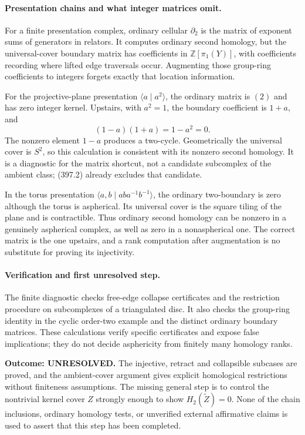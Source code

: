 \documentclass[11pt]{article}
\begin{document}
\paragraph{Presentation chains and what integer matrices omit.}
For a finite presentation complex, ordinary cellular $\partial_2$ is
the matrix of exponent sums of generators in relators. It computes
ordinary second homology, but the universal-cover boundary matrix has
coefficients in $\mathbb Z[\pi_1(Y)]$, with coefficients recording
where lifted edge traversals occur. Augmenting those group-ring
coefficients to integers forgets exactly that location information.

For the projective-plane presentation $\langle a\mid a^2\rangle$,
the ordinary matrix is $(2)$ and has zero integer kernel. Upstairs,
with $a^2=1$, the boundary coefficient is $1+a$, and
\[
 (1-a)(1+a)=1-a^2=0.
\]
The nonzero element $1-a$ produces a two-cycle. Geometrically the
universal cover is $S^2$, so this calculation is consistent with its
nonzero second homology. It is a diagnostic for the matrix shortcut,
not a candidate subcomplex of the ambient class; (397.2) already
excludes that candidate.

In the torus presentation $\langle a,b\mid aba^{-1}b^{-1}\rangle$,
the ordinary two-boundary is zero although the torus is aspherical.
Its universal cover is the square tiling of the plane and is contractible.
Thus ordinary second homology can be nonzero in a genuinely aspherical
complex, as well as zero in a nonaspherical one. The correct matrix is
the one upstairs, and a rank computation after augmentation is no
substitute for proving its injectivity.

\paragraph{Verification and first unresolved step.}
The finite diagnostic checks free-edge collapse certificates and the
restriction procedure on subcomplexes of a triangulated disc. It also
checks the group-ring identity in the cyclic order-two example and
the distinct ordinary boundary matrices. These calculations verify
specific certificates and expose false implications; they do not decide
asphericity from finitely many homology ranks.

\textbf{Outcome: UNRESOLVED.} The injective, retract and collapsible
subcases are proved, and the ambient-cover argument gives explicit
homological restrictions without finiteness assumptions. The missing
general step is to control the nontrivial kernel cover $Z$ strongly
enough to show $H_2(\widetilde Z)=0$. None of the chain inclusions,
ordinary homology tests, or unverified external affirmative claims is
used to assert that this step has been completed.
\end{document}

